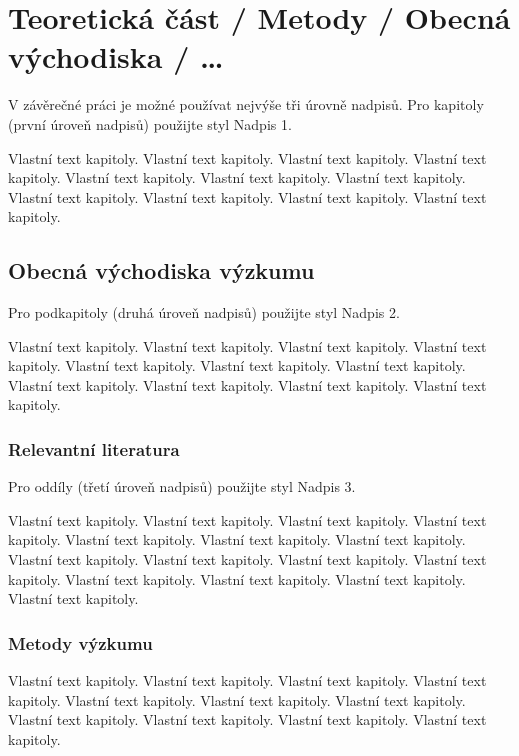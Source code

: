 \chapter{Teoretická část / Metody / Obecná východiska / …}

{\color{infoBlue}
V závěrečné práci je možné používat nejvýše tři úrovně nadpisů. Pro kapitoly (první úroveň nadpisů) použijte styl Nadpis 1. 
}

Vlastní text kapitoly. Vlastní text kapitoly. Vlastní text kapitoly. Vlastní text kapitoly. Vlastní text kapitoly. Vlastní text kapitoly. Vlastní text kapitoly. Vlastní text kapitoly. Vlastní text kapitoly. Vlastní text kapitoly. Vlastní text kapitoly.

\section{Obecná východiska výzkumu}

{\color{darkBlue}
Pro podkapitoly (druhá úroveň nadpisů) použijte styl Nadpis 2.
}

Vlastní text kapitoly. Vlastní text kapitoly. Vlastní text kapitoly. Vlastní text kapitoly. Vlastní text kapitoly. Vlastní text kapitoly. Vlastní text kapitoly. Vlastní text kapitoly. Vlastní text kapitoly. Vlastní text kapitoly. Vlastní text kapitoly.

\subsection{Relevantní literatura}

{\color{darkBlue}
Pro oddíly (třetí úroveň nadpisů) použijte styl Nadpis 3.
}

Vlastní text kapitoly. Vlastní text kapitoly. Vlastní text kapitoly. Vlastní text kapitoly. Vlastní text kapitoly. Vlastní text kapitoly. Vlastní text kapitoly. Vlastní text kapitoly. Vlastní text kapitoly. Vlastní text kapitoly. Vlastní text kapitoly. Vlastní text kapitoly. Vlastní text kapitoly. Vlastní text kapitoly. Vlastní text kapitoly. 

\subsection{Metody výzkumu}

Vlastní text kapitoly. Vlastní text kapitoly. Vlastní text kapitoly. Vlastní text kapitoly. Vlastní text kapitoly. Vlastní text kapitoly. Vlastní text kapitoly. Vlastní text kapitoly. Vlastní text kapitoly. Vlastní text kapitoly. Vlastní text kapitoly. 

